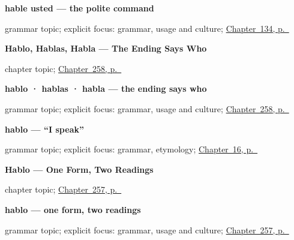 \noindent\begin{minipage}[t]{\linewidth}
\raggedright
\textbf{hable usted — the polite command}\par
\footnotesize grammar topic; explicit focus: grammar, usage and culture; \hyperref[ch:command-usted]{Chapter~134, p.~\pageref*{ch:command-usted}}
\end{minipage}\par\smallskip

\noindent\begin{minipage}[t]{\linewidth}
\raggedright
\textbf{Hablo, Hablas, Habla --- The Ending Says Who}\par
\footnotesize chapter topic; \hyperref[ch:terminacion]{Chapter~258, p.~\pageref*{ch:terminacion}}
\end{minipage}\par\smallskip

\noindent\begin{minipage}[t]{\linewidth}
\raggedright
\textbf{hablo · hablas · habla — the ending says who}\par
\footnotesize grammar topic; explicit focus: grammar, usage and culture; \hyperref[ch:terminacion]{Chapter~258, p.~\pageref*{ch:terminacion}}
\end{minipage}\par\smallskip

\noindent\begin{minipage}[t]{\linewidth}
\raggedright
\textbf{hablo — \textquotedblleft{}I speak\textquotedblright{}}\par
\footnotesize grammar topic; explicit focus: grammar, etymology; \hyperref[ch:first-verb]{Chapter~16, p.~\pageref*{ch:first-verb}}
\end{minipage}\par\smallskip

\noindent\begin{minipage}[t]{\linewidth}
\raggedright
\textbf{Hablo --- One Form, Two Readings}\par
\footnotesize chapter topic; \hyperref[ch:hablo-dos]{Chapter~257, p.~\pageref*{ch:hablo-dos}}
\end{minipage}\par\smallskip

\noindent\begin{minipage}[t]{\linewidth}
\raggedright
\textbf{hablo — one form, two readings}\par
\footnotesize grammar topic; explicit focus: grammar, usage and culture; \hyperref[ch:hablo-dos]{Chapter~257, p.~\pageref*{ch:hablo-dos}}
\end{minipage}\par\smallskip

